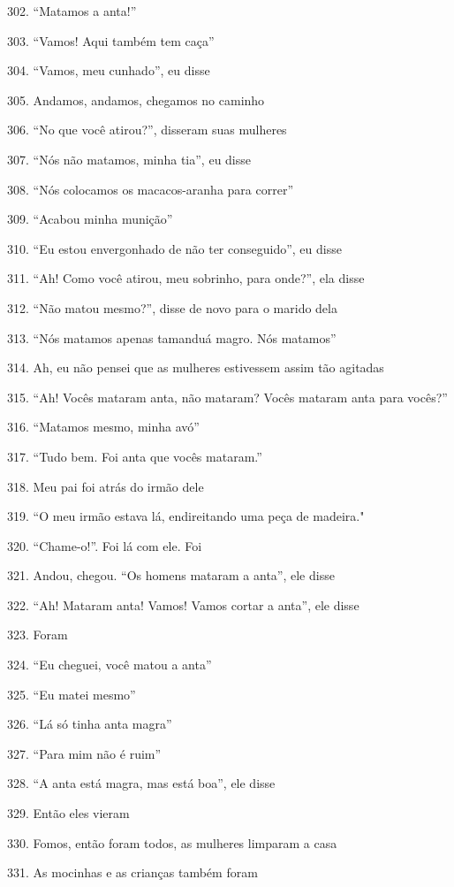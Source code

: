 302. ``Matamos a anta!''

303. ``Vamos! Aqui também tem caça''

304. ``Vamos, meu cunhado'', eu disse

305. Andamos, andamos, chegamos no caminho

306. ``No que você atirou?'', disseram suas mulheres

307. ``Nós não matamos, minha tia'', eu disse

308. ``Nós colocamos os macacos-aranha para correr''

309. ``Acabou minha munição''

310. ``Eu estou envergonhado de não ter conseguido'', eu disse

311. ``Ah! Como você atirou, meu sobrinho, para onde?'', ela disse

312. ``Não matou mesmo?'', disse de novo para o marido dela

313. ``Nós matamos apenas tamanduá magro. Nós matamos''

314. Ah, eu não pensei que as mulheres estivessem assim tão agitadas

315. ``Ah! Vocês mataram anta, não mataram? Vocês mataram anta para vocês?''

316. ``Matamos mesmo, minha avó''

317. ``Tudo bem. Foi anta que vocês mataram.''

318. Meu pai foi atrás do irmão dele

319. ``O meu irmão estava lá, endireitando uma peça de madeira."

320. ``Chame-o!''. Foi lá com ele. Foi

321. Andou, chegou. ``Os homens mataram a anta'', ele disse

322. ``Ah! Mataram anta! Vamos! Vamos cortar a anta'', ele disse

323. Foram

324. ``Eu cheguei, você matou a anta''

325. ``Eu matei mesmo''

326. ``Lá só tinha anta magra''

327. ``Para mim não é ruim''

328. ``A anta está magra, mas está boa'', ele disse

329. Então eles vieram

330. Fomos, então foram todos, as mulheres limparam a casa

331. As mocinhas e as crianças também foram

